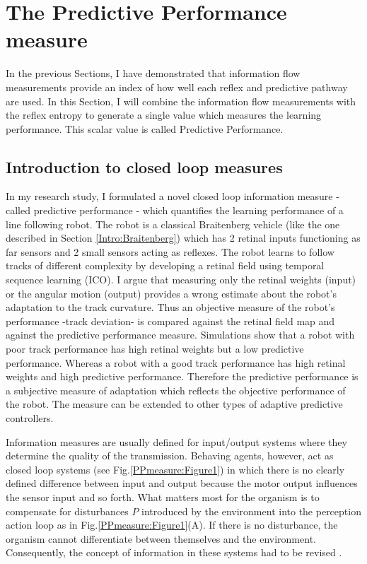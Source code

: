 \section{The Predictive Performance measure}
\label{Chapter8:Predictive Performance}

In the previous Sections, I have demonstrated that information flow measurements 
provide an index of how well each reflex and predictive pathway are used.
In this Section, I will combine the information flow measurements with the reflex entropy
to generate a single value which measures the learning performance.
This scalar value is called Predictive Performance.

\subsection{Introduction to closed loop measures}
In my research study, I formulated a novel closed loop information measure -
called predictive performance - which quantifies the learning
performance of a line following robot.  The robot is a classical
Braitenberg vehicle (like the one described in Section \ref{Intro:Braitenberg}) 
which has 2 retinal inputs functioning as far
sensors and 2 small sensors acting as reflexes. The robot learns to
follow tracks of different complexity by developing a retinal field
using temporal sequence learning (ICO).  I argue that measuring
only the retinal weights (input) or the angular motion (output)
provides a wrong estimate about the robot's adaptation to the track
curvature.  Thus an objective measure of the robot's performance
-track deviation- is compared against the retinal field map and
against the predictive performance measure.  Simulations show that a
robot with poor track performance has high retinal weights but a low
predictive performance. Whereas a robot with a good track
performance has high retinal weights and high predictive
performance.  Therefore the predictive performance is a subjective
measure of adaptation which reflects the objective performance of
the robot.  The measure can be extended to other types of adaptive
predictive controllers.

Information measures are usually defined for input/output systems
where they determine the quality of the transmission. Behaving agents,
however, act as closed loop systems (see Fig.\ref{PPmeasure:Figure1}) in which
there is no clearly defined difference between input and output because
the motor output influences the sensor input and so forth. What
matters most for the organism is to compensate for disturbances $P$
introduced by the environment into the perception action loop as in
Fig.\ref{PPmeasure:Figure1}(A). If there is no disturbance, the organism cannot
differentiate between themselves and the environment. Consequently,
the concept of information in these systems had to be revised
\citep{RadicalConstruct}.

